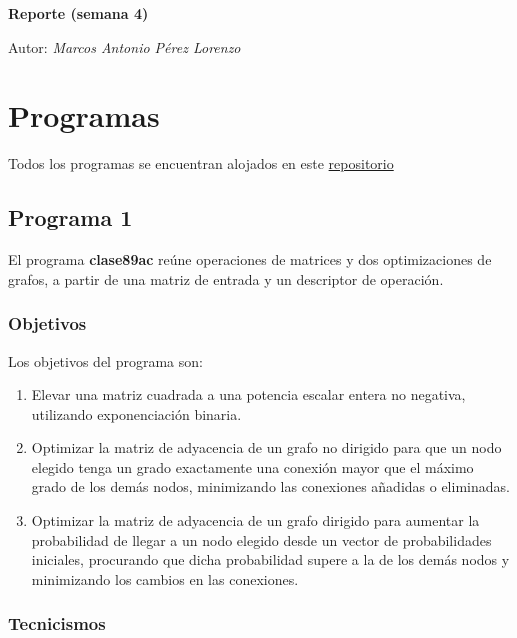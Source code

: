 \documentclass{article}[12pt,a4paper]
\begin{document}
\begin{titlepage}

  \centering
  {\huge\bfseries Reporte (semana 4)\par}
  {\Large Autor: \itshape Marcos Antonio Pérez Lorenzo\par}
\end{titlepage}

\pagebreak



\section{Programas}

Todos los programas se encuentran alojados en este \href{https://github.com/MarcosHCK/master-programming/}{repositorio \faGithubSquare}

\subsection{Programa 1}

El programa \textbf{clase89ac} reúne operaciones de matrices y dos optimizaciones de grafos, a partir de una matriz de entrada y un descriptor de operación.

\subsubsection{Objetivos}

Los objetivos del programa son:

\begin{enumerate}
  \item Elevar una matriz cuadrada a una potencia escalar entera no negativa, utilizando exponenciación binaria.
  \item Optimizar la matriz de adyacencia de un grafo no dirigido para que un nodo elegido tenga un grado exactamente una conexión mayor que el máximo grado de los demás nodos, minimizando las conexiones añadidas o eliminadas.
  \item Optimizar la matriz de adyacencia de un grafo dirigido para aumentar la probabilidad de llegar a un nodo elegido desde un vector de probabilidades iniciales, procurando que dicha probabilidad supere a la de los demás nodos y minimizando los cambios en las conexiones.
\end{enumerate}

\subsubsection{Tecnicismos}
\end{document}
